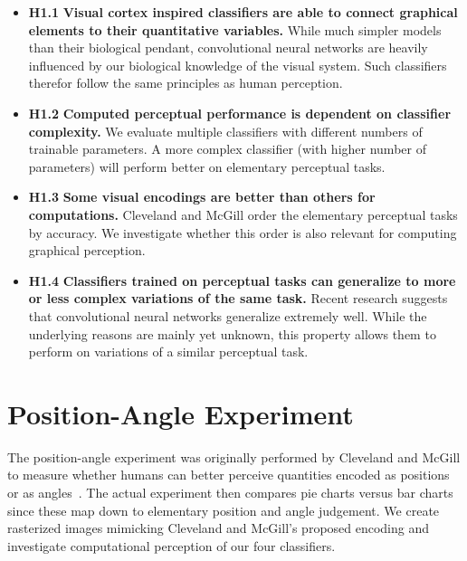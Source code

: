 \documentclass[journal]{vgtc}                %
\begin{document}
\begin{itemize}
	\item \textbf{H1.1} \textbf{Visual cortex inspired classifiers are able to connect graphical elements to their quantitative variables.} While much simpler models than their biological pendant, convolutional neural networks are heavily influenced by our biological knowledge of the visual system. Such classifiers therefor follow the same principles as human perception.
	\item \textbf{H1.2} \textbf{Computed perceptual performance is dependent on classifier complexity.} We evaluate multiple classifiers with different numbers of trainable parameters. A more complex classifier (with higher number of parameters) will perform better on elementary perceptual tasks.
	\item \textbf{H1.3} \textbf{Some visual encodings are better than others for computations.} Cleveland and McGill order the elementary perceptual tasks by accuracy. We investigate whether this order is also relevant for computing graphical perception.
	\item \textbf{H1.4} \textbf{Classifiers trained on perceptual tasks can generalize to more or less complex variations of the same task.} Recent research suggests that convolutional neural networks generalize extremely well. While the underlying reasons are mainly yet unknown, this property allows them to perform on variations of a similar perceptual task.
\end{itemize}

\section{Position-Angle Experiment}

The position-angle experiment was originally performed by Cleveland and McGill to measure whether humans can better perceive quantities encoded as positions or as angles~\cite{cleveland_mcgill}. The actual experiment then compares pie charts versus bar charts since these map down to elementary position and angle judgement. We create rasterized images mimicking Cleveland and McGill's proposed encoding and investigate computational perception of our four classifiers.
\end{document}
